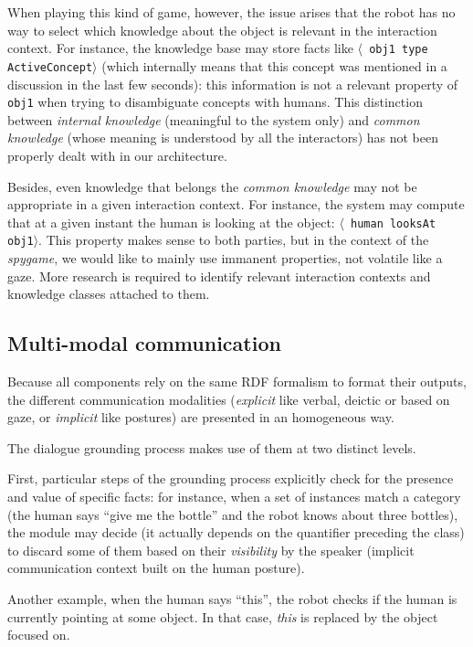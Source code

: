 \documentclass[letterpaper, 10 pt, conference]{ieeeconf}  %
\newcommand{\concept}[1]{{\small \texttt{#1}}}
\newcommand{\stmt}[1]{{\footnotesize \tt $\langle$ #1\relax$\rangle$}}
\begin{document}
When playing this kind of game, however, the issue arises that the robot has no
way to select which knowledge about the object is relevant in the interaction
context. For instance, the knowledge base may store facts like \stmt{obj1 type
ActiveConcept} (which internally means that this concept was mentioned in a
discussion in the last few seconds): this information is not a relevant
property of \concept{obj1} when trying to disambiguate concepts with humans.
This distinction between \emph{internal knowledge} (meaningful to
the system only) and \emph{common knowledge} (whose meaning is understood by
all the interactors) has not been properly dealt with in our architecture.

Besides, even knowledge that belongs the \emph{common knowledge} may not be
appropriate in a given interaction context. For instance, the system may
compute that at a given instant the human is looking at the object: \stmt{human
looksAt obj1}. This property makes sense to both parties, but in the context of
the \emph{spygame}, we would like to mainly use immanent properties, not
volatile like a gaze. More research is required to identify relevant
interaction contexts and knowledge classes attached to them.

\subsection{Multi-modal communication}

Because all components rely on the same RDF formalism to format their outputs,
the different communication modalities (\emph{explicit} like verbal, deictic or
based on gaze, or \emph{implicit} like postures) are presented in an
homogeneous way.

The dialogue grounding process makes use of them at two distinct levels.

First, particular steps of the grounding process explicitly check for the
presence and value of specific facts: for instance, when a set of instances
match a category (the human says ``give me the bottle'' and the robot knows
about three bottles), the module may decide (it actually depends on the
quantifier preceding the class) to discard some of them based on their
\emph{visibility} by the speaker (implicit communication context built on the
human posture).

Another example, when the human says ``this'', the robot checks if the human is
currently pointing at some object. In that case, \emph{this} is replaced by the
object focused on.
\end{document}
